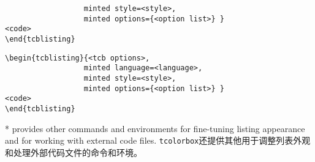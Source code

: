 \begin{optionlist}
\begin{paracol}{2}
\begin{Verbatim}
                  minted style=<style>,
                  minted options={<option list>} }
<code>
\end{tcblisting}
\end{Verbatim}
\switchcolumn
\begin{Verbatim}
\begin{tcblisting}{<tcb options>,
                  minted language=<language>,
                  minted style=<style>,
                  minted options={<option list>} }
<code>
\end{tcblisting}
\end{Verbatim}
\switchcolumn[0]*%
 provides other commands and environments for fine-tuning listing appearance and for working with external code files.
\switchcolumn
\texttt{tcolorbox}还提供其他用于调整列表外观和处理外部代码文件的命令和环境。
\end{paracol}
\end{optionlist}
